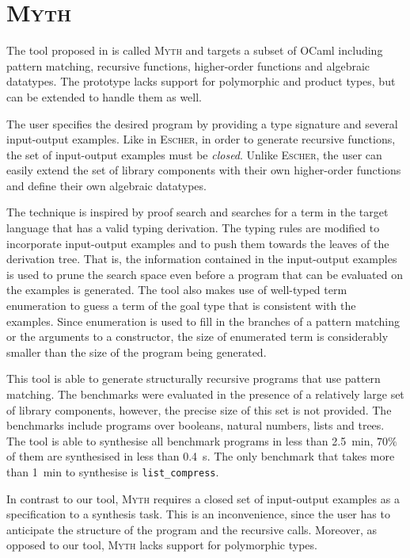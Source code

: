 \section{\mdseries\textsc{Myth}}

The tool proposed in \cite{MythPaper} is called \textsc{Myth} and targets a subset of OCaml including pattern matching, recursive functions, higher-order functions and algebraic datatypes. The prototype lacks support for polymorphic and product types, but can be extended to handle them as well.

The user specifies the desired program by providing a type signature and several input-output examples. Like in \textsc{Escher}, in order to generate recursive functions, the set of input-output examples must be \emph{closed}. Unlike \textsc{Escher}, the user can easily extend the set of library components with their own higher-order functions and define their own algebraic datatypes.

The technique is inspired by proof search and searches for a term in the target language that has a valid typing derivation. The typing rules are modified to incorporate input-output examples and to push them towards the leaves of the derivation tree. That is, the information contained in the input-output examples is used to prune the search space even before a program that can be evaluated on the examples is generated. The tool also makes use of well-typed term enumeration to guess a term of the goal type that is consistent with the examples. Since enumeration is used to fill in the branches of a pattern matching or the arguments to a constructor, the size of enumerated term is considerably smaller than the size of the program being generated.

This tool is able to generate structurally recursive programs that use pattern matching. The benchmarks were evaluated in the presence of a relatively large set of library components, however, the precise size of this set is not provided. The benchmarks include programs over booleans, natural numbers, lists and trees. The tool is able to synthesise all benchmark programs in less than \SI{2.5}{min}, $70\%$ of them are synthesised in less than \SI{0.4}{s}. The only benchmark that takes more than \SI{1}{min} to synthesise is \lstinline!list_compress!.

In contrast to our tool, \textsc{Myth} requires a closed set of input-output examples as a specification to a synthesis task. This is an inconvenience, since the user has to anticipate the structure of the program and the recursive calls. Moreover, as opposed to our tool, \textsc{Myth} lacks support for polymorphic types.

